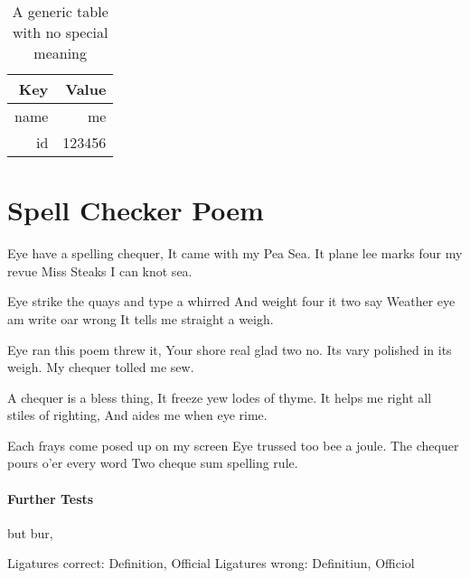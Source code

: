 \documentclass{scrartcl}
\begin{document}
\begin{table}
	\centering
    \begin{tabular}{@{}rr@{}} 
    \textbf{Key}  & \textbf{Value} \\ \hline
    name & me \\
    id & 123456\\
    \end{tabular}
    \caption{A generic table with no special meaning}
    \label{tab:example}
\end{table}


\section{Spell Checker Poem}
Eye have a spelling chequer,
It came with my Pea Sea.
It plane lee marks four my revue
Miss Steaks I can knot sea.

Eye strike the quays and type a whirred
And weight four it two say
Weather eye am write oar wrong
It tells me straight a weigh.

Eye ran this poem threw it,
Your shore real glad two no.
Its vary polished in its weigh.
My chequer tolled me sew.

A chequer is a bless thing,
It freeze yew lodes of thyme.
It helps me right all stiles of righting,
And aides me when eye rime.

Each frays come posed up on my screen
Eye trussed too bee a joule.
The chequer pours o'er every word
Two cheque sum spelling rule.


\paragraph{Further Tests}
but bur, 

Ligatures correct: Deﬁnition, Oﬀicial
Ligatures wrong: Deﬁnitiun, Oﬀiciol
\end{document}
